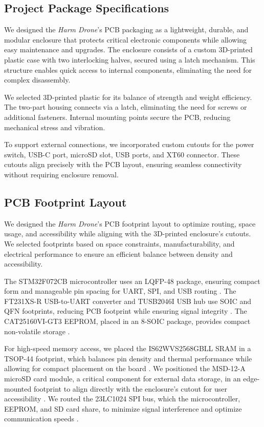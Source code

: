 \documentclass[12pt]{article}
\begin{document}
\subsection{Project Package Specifications}

We designed the \textit{Harm Drone}’s PCB packaging as a lightweight, durable, and modular enclosure that protects critical electronic components while allowing easy maintenance and upgrades. The enclosure consists of a custom 3D-printed plastic case with two interlocking halves, secured using a latch mechanism. This structure enables quick access to internal components, eliminating the need for complex disassembly.

We selected 3D-printed plastic for its balance of strength and weight efficiency. The two-part housing connects via a latch, eliminating the need for screws or additional fasteners. Internal mounting points secure the PCB, reducing mechanical stress and vibration.

To support external connections, we incorporated custom cutouts for the power switch, USB-C port, microSD slot, USB ports, and XT60 connector. These cutouts align precisely with the PCB layout, ensuring seamless connectivity without requiring enclosure removal.

\subsection{PCB Footprint Layout}

We designed the \textit{Harm Drone}’s PCB footprint layout to optimize routing, space usage, and accessibility while aligning with the 3D-printed enclosure’s cutouts. We selected footprints based on space constraints, manufacturability, and electrical performance to ensure an efficient balance between density and accessibility.

The STM32F072CB microcontroller uses an LQFP-48 package, ensuring compact form and manageable pin spacing for UART, SPI, and USB routing \cite{stm32}. The FT231XS-R USB-to-UART converter and TUSB2046I USB hub use SOIC and QFN footprints, reducing PCB footprint while ensuring signal integrity \cite{ft231x} \cite{tusb2046i}. The CAT25160VI-GT3 EEPROM, placed in an 8-SOIC package, provides compact non-volatile storage \cite{cat25160}.

For high-speed memory access, we placed the IS62WVS2568GBLL SRAM in a TSOP-44 footprint, which balances pin density and thermal performance while allowing for compact placement on the board \cite{is62}. We positioned the MSD-12-A microSD card module, a critical component for external data storage, in an edge-mounted footprint to align directly with the enclosure’s cutout for user accessibility \cite{msd12}. We routed the 23LC1024 SPI bus, which the microcontroller, EEPROM, and SD card share, to minimize signal interference and optimize communication speeds \cite{23lc1024}.
\end{document}
